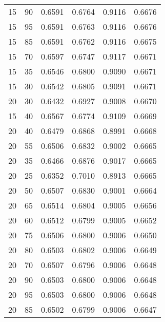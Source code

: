 \begin{center}
\begin{longtable}{|l|l|l|l|l|l|}
15                & 90                & 0.6591    & 0.6764 & 0.9116      & 0.6676    \\
15                & 95                & 0.6591    & 0.6763 & 0.9116      & 0.6676    \\
15                & 85                & 0.6591    & 0.6762 & 0.9116      & 0.6675    \\
15                & 70                & 0.6597    & 0.6747 & 0.9117      & 0.6671    \\
15                & 35                & 0.6546    & 0.6800 & 0.9090      & 0.6671    \\
15                & 30                & 0.6542    & 0.6805 & 0.9091      & 0.6671    \\
20                & 30                & 0.6432    & 0.6927 & 0.9008      & 0.6670    \\
15                & 40                & 0.6567    & 0.6774 & 0.9109      & 0.6669    \\
20                & 40                & 0.6479    & 0.6868 & 0.8991      & 0.6668    \\
20                & 55                & 0.6506    & 0.6832 & 0.9002      & 0.6665    \\
20                & 35                & 0.6466    & 0.6876 & 0.9017      & 0.6665    \\
20                & 25                & 0.6352    & 0.7010 & 0.8913      & 0.6665    \\
20                & 50                & 0.6507    & 0.6830 & 0.9001      & 0.6664    \\
20                & 65                & 0.6514    & 0.6804 & 0.9005      & 0.6656    \\
20                & 60                & 0.6512    & 0.6799 & 0.9005      & 0.6652    \\
20                & 75                & 0.6506    & 0.6800 & 0.9006      & 0.6650    \\
20                & 80                & 0.6503    & 0.6802 & 0.9006      & 0.6649    \\
20                & 70                & 0.6507    & 0.6796 & 0.9006      & 0.6648    \\
20                & 90                & 0.6503    & 0.6800 & 0.9006      & 0.6648    \\
20                & 95                & 0.6503    & 0.6800 & 0.9006      & 0.6648    \\
20                & 85                & 0.6502    & 0.6799 & 0.9006      & 0.6647    \\

\end{longtable}
\end{center}
